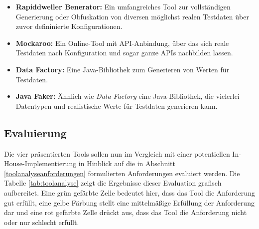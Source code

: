 \begin{itemize}
    \item \textbf{Rapiddweller Benerator:} Ein umfangreiches Tool zur vollständigen Generierung oder Obfuskation von diversen möglichst realen Testdaten über zuvor defininierte Konfigurationen. \cite{benerator:2022}
    \item \textbf{Mockaroo:} Ein Online-Tool mit \ac{API}-Anbindung, über das sich reale Testdaten nach Konfiguration und sogar ganze \ac{API}s nachbilden lassen. \cite{mockaroo:2022}
    \item \textbf{Data Factory:} Eine Java-Bibliothek zum Generieren von Werten für Testdaten. \cite{datafactory:2022}
    \item \textbf{Java Faker:} Ähnlich wie \textit{Data Factory} eine Java-Bibliothek, die vielerlei Datentypen und realistische Werte für Testdaten generieren kann. \cite{javafaker:2022}
\end{itemize}

\subsection{Evaluierung}\label{toolanalysevaluierung}
Die vier präsentierten Tools sollen nun im Vergleich mit einer potentiellen In-House-Implementierung in Hinblick auf die in Abschnitt \ref{toolanalyseanforderungen} formulierten Anforderungen evaluiert werden. Die Tabelle \ref{tab:toolanalyse} zeigt die Ergebnisse dieser Evaluation grafisch aufbereitet. Eine grün gefärbte Zelle bedeutet hier, dass das Tool die Anforderung gut erfüllt, eine gelbe Färbung stellt eine mittelmäßige Erfüllung der Anforderung dar und eine rot gefärbte Zelle drückt aus, dass das Tool die Anforderung nicht oder nur schlecht erfüllt.

